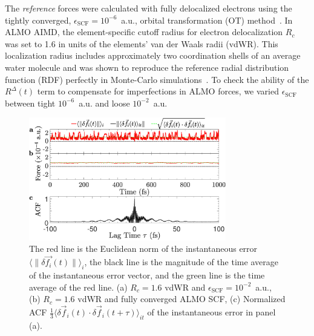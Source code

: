 \documentclass[aip,jcp,reprint,amsmath,amssymb]{revtex4-1}
\begin{document}
The \emph{reference} forces were calculated with fully delocalized electrons using the tightly converged, $\epsilon_{\text{SCF}}=10^{-6}$~a.u., orbital transformation (OT) method~\cite{a:ot}. 
In ALMO AIMD, the element-specific cutoff radius for electron delocalization $R_c$ was set to 1.6 in units of the elements' van der Waals radii (vdWR). This localization radius includes approximately two coordination shells of an average water molecule and was shown to reproduce the reference radial distribution function (RDF) perfectly in Monte-Carlo simulations~\cite{a:almo-ls}. 
%
To check the ability of the $R^{\Delta}(t)$ term to compensate for imperfections in ALMO forces, we varied $\epsilon_{\text{SCF}}$ between tight $10^{-6}$~a.u. and loose $10^{-2}$~a.u. 

\begin{figure}
\includegraphics[trim={0.5cm 0cm 0.7cm 0.1cm},clip,width=8.6cm]{2.eps}
\caption{\label{fig:randomforce} 
The red line is the Euclidean norm of the instantaneous error $\langle \| \delta \vec{f_{i}}(t) \| \rangle_{i}$, the black line is the magnitude of the time average of the instantaneous error vector, and the green line is the time average of the red line. 
(a) $R_{c} = 1.6$ vdWR and $\epsilon_{\text{SCF}} = 10^{-2}$~a.u., 
(b) $R_{c} = 1.6$ vdWR and fully converged ALMO SCF, 
(c) Normalized ACF $\frac{1}{3}\langle \delta \vec{f}_i (t) \cdot \delta\vec{f}_i(t+\tau) \rangle_{it}$ of the instantaneous error in panel (a).
}
\end{figure}
\end{document}
